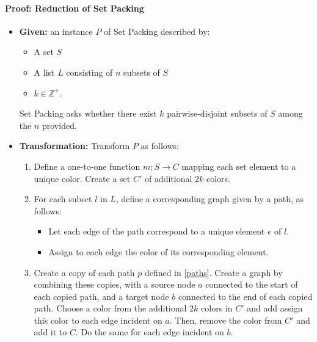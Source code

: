 \documentclass{article}
\begin{document}
  \paragraph{Proof: Reduction of Set Packing}
  \begin{itemize}
    \item \textbf{Given:} an instance $P$ of Set Packing described by:
      \begin{itemize}
        \item A set $S$
        \item A list $L$ consisting of $n$ subsets of $S$
        \item $k \in \mathbb{Z}^+$.
      \end{itemize}

      Set Packing asks whether there exist $k$ pairwise-disjoint
      subsets of $S$ among the $n$ provided.

    \item \label{transform} \textbf{Transformation:} Transform $P$
    as follows: 
      \begin{enumerate}
        \item Define a one-to-one function $m: S \rightarrow C$
        mapping each set element to a unique color. Create a set $C'$ 
        of additional $2k$ colors. 

        \item \label{paths} For each subset $l$ in $L$, define a
        corresponding graph given by a path, as follows: 
          \begin{itemize}
            \item Let each edge of the path correspond to a unique
            element $e$ of $l$.

            \item Assign to each edge the color of its corresponding
            element. 
          \end{itemize}

        \item \label{component} Create a copy of each path $p$ defined in
        \ref{paths}. Create a graph by combining these copies, with a
        source node $a$ connected to the start of each copied path, and a
        target node $b$ connected to the end of each copied path.
        Choose a color from the additional $2k$ colors in $C'$ and add
        assign this color to each edge incident on $a$. Then, remove
        the color from $C'$ and add it to $C$. Do the same for each
        edge incident on $b$.


\end{enumerate}
\end{itemize}
\end{document}
